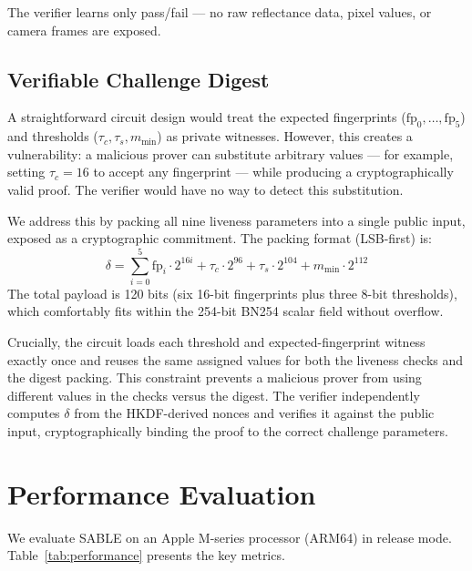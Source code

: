 \documentclass[conference]{IEEEtran}
\begin{document}
The verifier learns only pass/fail --- no raw reflectance data, pixel values, or camera frames are exposed.

\subsection{Verifiable Challenge Digest}
\label{sec:challenge-digest}

A straightforward circuit design would treat the expected fingerprints ($\text{fp}_0, \ldots, \text{fp}_5$) and thresholds ($\tau_c, \tau_s, m_{\min}$) as private witnesses. However, this creates a vulnerability: a malicious prover can substitute arbitrary values --- for example, setting $\tau_c = 16$ to accept any fingerprint --- while producing a cryptographically valid proof. The verifier would have no way to detect this substitution.

We address this by packing all nine liveness parameters into a single public input, exposed as a cryptographic commitment. The packing format (LSB-first) is:
\begin{equation}
\delta = \sum_{i=0}^{5} \text{fp}_i \cdot 2^{16i} + \tau_c \cdot 2^{96} + \tau_s \cdot 2^{104} + m_{\min} \cdot 2^{112}
\label{eq:challenge-digest}
\end{equation}
The total payload is 120 bits (six 16-bit fingerprints plus three 8-bit thresholds), which comfortably fits within the 254-bit BN254 scalar field without overflow.

Crucially, the circuit loads each threshold and expected-fingerprint witness exactly once and reuses the same assigned values for both the liveness checks and the digest packing. This constraint prevents a malicious prover from using different values in the checks versus the digest. The verifier independently computes $\delta$ from the HKDF-derived nonces and verifies it against the public input, cryptographically binding the proof to the correct challenge parameters.

\section{Performance Evaluation}
\label{sec:performance}

We evaluate SABLE on an Apple M-series processor (ARM64) in release mode. Table~\ref{tab:performance} presents the key metrics.
\end{document}
